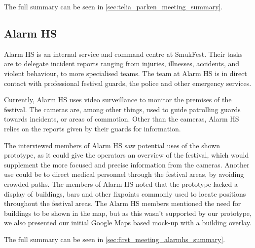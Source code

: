 The full summary can be seen in \cref{sec:telia_parken_meeting_summary}.


\subsection{Alarm HS}
Alarm HS is an internal service and command centre at SmukFest. Their tasks are to delegate incident reports ranging from injuries, illnesses, accidents, and violent behaviour, to more specialised teams. The team at Alarm HS is in direct contact with professional festival guards, the police and other emergency services. 

Currently, Alarm HS uses video surveillance to monitor the premises of the festival. The cameras are, among other things, used to guide patrolling guards towards incidents, or areas of commotion. Other than the cameras, Alarm HS relies on the reports given by their guards for information.

The interviewed members of Alarm HS saw potential uses of the shown prototype, as it could give the operators an overview of the festival, which would supplement the more focused and precise information from the cameras. Another use could be to direct medical personnel through the festival areas, by avoiding crowded paths. The members of Alarm HS noted that the prototype lacked a display of buildings, bars and other fixpoints commonly used to locate positions throughout the festival areas. The Alarm HS members mentioned the need for buildings to be shown in the map, but as this wasn't supported by our prototype, we also presented our initial Google Maps based mock-up with a building overlay.

The full summary can be seen in \cref{sec:first_meeting_alarmhs_summary}.
